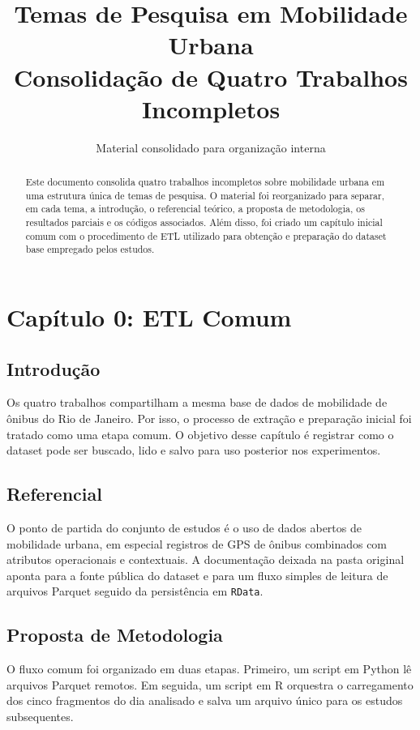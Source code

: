 \documentclass[runningheads]{llncs}
\title{Temas de Pesquisa em Mobilidade Urbana\\Consolidação de Quatro Trabalhos Incompletos}
\author{Material consolidado para organização interna}
\institute{CEFET/RJ}
\date{}
\begin{document}
\maketitle

\begin{abstract}
Este documento consolida quatro trabalhos incompletos sobre mobilidade urbana em uma estrutura única de temas de pesquisa. O material foi reorganizado para separar, em cada tema, a introdução, o referencial teórico, a proposta de metodologia, os resultados parciais e os códigos associados. Além disso, foi criado um capítulo inicial comum com o procedimento de ETL utilizado para obtenção e preparação do dataset base empregado pelos estudos.
\end{abstract}

\section{Capítulo 0: ETL Comum}

\subsection{Introdução}
Os quatro trabalhos compartilham a mesma base de dados de mobilidade de ônibus do Rio de Janeiro. Por isso, o processo de extração e preparação inicial foi tratado como uma etapa comum. O objetivo desse capítulo é registrar como o dataset pode ser buscado, lido e salvo para uso posterior nos experimentos.

\subsection{Referencial}
O ponto de partida do conjunto de estudos é o uso de dados abertos de mobilidade urbana, em especial registros de GPS de ônibus combinados com atributos operacionais e contextuais. A documentação deixada na pasta original aponta para a fonte pública do dataset e para um fluxo simples de leitura de arquivos Parquet seguido da persistência em \texttt{RData}.

\subsection{Proposta de Metodologia}
O fluxo comum foi organizado em duas etapas. Primeiro, um script em Python lê arquivos Parquet remotos. Em seguida, um script em R orquestra o carregamento dos cinco fragmentos do dia analisado e salva um arquivo único para os estudos subsequentes.
\end{document}
